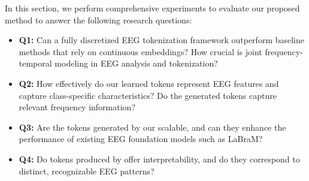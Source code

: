 


In this section, we perform comprehensive experiments to evaluate our proposed method to answer the following research questions:
\begin{itemize}[leftmargin=*]
\item \textbf{Q1:} Can a fully discretized EEG tokenization framework outperform baseline methods that rely on continuous embeddings? How crucial is joint frequency-temporal modeling in EEG analysis and tokenization? 


\item\textbf{Q2:} How effectively do our learned tokens represent EEG features and capture class-specific characteristics? Do the generated tokens capture relevant frequency information?






\item \textbf{Q3:}  Are the tokens generated by our \tokenizer scalable, and can they enhance the performance of existing EEG foundation models such as LaBraM?

\item \textbf{Q4:}  Do tokens produced by \tokenizer offer interpretability, and do they correspond to distinct, recognizable EEG patterns?
\end{itemize}

